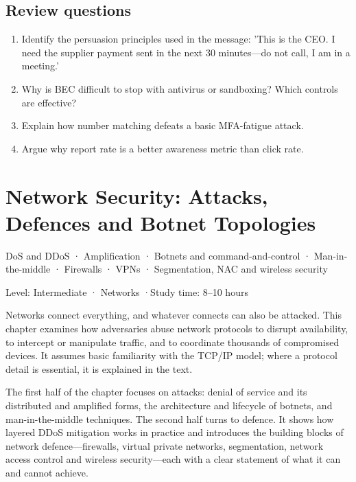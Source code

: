 \documentclass[11pt,openany]{book}
\newcommand{\chaptermeta}[3]{%
  {\sffamily\small\color{accent}#1\par}\vspace{0.3em}
  {\sffamily\footnotesize\color{gray}#2 \quad·\quad #3\par}\vspace{1.2em}}
\begin{document}
\section*{Review questions}
\begin{enumerate}
  \item Identify the persuasion principles used in the message: 'This is the CEO. I need the supplier payment sent in the next 30 minutes—do not call, I am in a meeting.'
  \item Why is BEC difficult to stop with antivirus or sandboxing? Which controls are effective?
  \item Explain how number matching defeats a basic MFA-fatigue attack.
  \item Argue why report rate is a better awareness metric than click rate.
\end{enumerate}

\chapter{Network Security: Attacks, Defences and Botnet Topologies}\label{ch:6}
\chaptermeta{DoS and DDoS · Amplification · Botnets and command-and-control · Man-in-the-middle · Firewalls · VPNs · Segmentation, NAC and wireless security}{Level: Intermediate · Networks}{Study time: 8–10 hours}

Networks connect everything, and whatever connects can also be attacked. This chapter examines how adversaries abuse network protocols to disrupt availability, to intercept or manipulate traffic, and to coordinate thousands of compromised devices. It assumes basic familiarity with the TCP/IP model; where a protocol detail is essential, it is explained in the text.

The first half of the chapter focuses on attacks: denial of service and its distributed and amplified forms, the architecture and lifecycle of botnets, and man-in-the-middle techniques. The second half turns to defence. It shows how layered DDoS mitigation works in practice and introduces the building blocks of network defence—firewalls, virtual private networks, segmentation, network access control and wireless security—each with a clear statement of what it can and cannot achieve.
\end{document}
